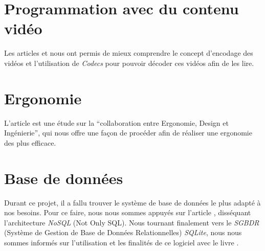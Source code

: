 \documentclass[a4paper,twoside,10pt]{report}
\begin{document}
\section{Programmation avec du contenu vidéo}

Les articles \cite{ghanbari1999video} et \cite{he2013introduction} nous ont permis de mieux comprendre le concept d'encodage des vidéos et l'utilisation de \textit{Codecs} pour pouvoir décoder ces vidéos afin de les lire.

\section{Ergonomie}

L'article \cite{lente2014scenariser} est une étude sur la “collaboration entre Ergonomie, Design et Ingénierie”, qui nous offre une façon de procéder afin de réaliser une ergonomie des plus efficace.

\section{Base de données}

Durant ce projet, il a fallu trouver le système de base de données le plus adapté à nos besoins. Pour ce faire, nous nous sommes appuyés sur l'article \cite{strauchnosql}, disséquant l'architecture \textit{NoSQL} (Not Only SQL).
Nous tournant finalement vers le \textit{SGBDR} (Système de Gestion de Base de Données Relationnelles) \textit{SQLite}, nous nous sommes informés sur l'utilisation et les finalités de ce logiciel avec le livre \cite{kreibich2010using}.







\nocite{*} %




\appendix

\end{document}
